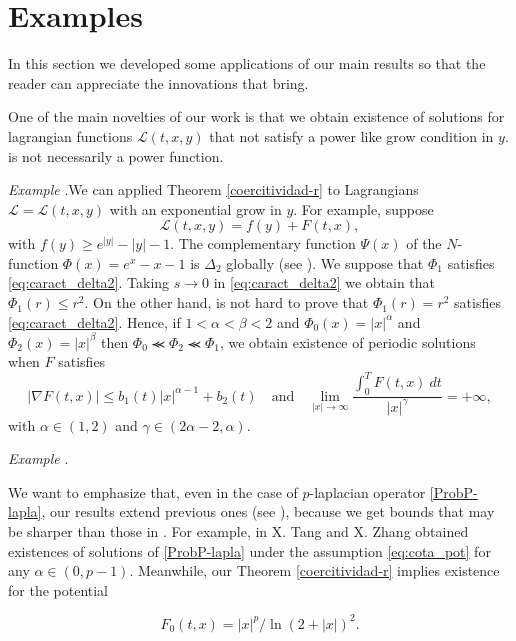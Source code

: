 \documentclass[twoside]{article}
\theoremstyle{remark}
\renewcommand{\leq}{\leqslant}
\renewcommand{\geq}{\geqslant}
\newcounter{example}
\newenvironment{example}{\noindent\textit{Example} \arabic{example}.}{\addtocounter{example}{1}}
\begin{document}
 \section{Examples}

 In this section we developed some applications of our main results
so that the reader can appreciate the innovations that bring.


One of the main novelties of our work is that we obtain existence of solutions for lagrangian functions $\mathcal{L}(t,x,y)$ that not satisfy a power like grow condition in $y$.   is not necessarily  a power function.

\begin{example}We can applied Theorem \ref{coercitividad-r} to Lagrangians $\mathcal{L}=\mathcal{L}(t,x,y)$ with an exponential grow in $y$. For example, suppose
  \[\mathcal{L}(t,x,y)=f(y)+F(t,x),\]
with $f(y)\geq e^{|y|}-|y|-1$. The complementary
function  $\Psi(x)$ of the $N$-function $\Phi(x)=e^{x}-x-1$ is $\Delta_2$ globally (see \cite[p. 28]{KR}).  We suppose that $\Phi_1$ satisfies \eqref{eq:caract_delta2}. Taking $s\to 0$ in \eqref{eq:caract_delta2} we obtain that $\Phi_1(r)\leq r^2$. On the other hand,  is not hard to prove that $\Phi_1(r)= r^2$ satisfies  \eqref{eq:caract_delta2}. Hence, if $1<\alpha<\beta<2$ and $\Phi_0(x)=|x|^{\alpha}$ and $\Phi_2(x)=|x|^{\beta}$ then $\Phi_0 \llcurly\Phi_2\llcurly\Phi_1$,  we obtain existence of periodic solutions when $F$
satisfies
\[\left| \nabla F(t,x) \right|\leq b_1(t)|x|^{\alpha-1}+b_2(t)\quad\text{and}\quad \lim_{|x|\to\infty}\frac{\int_{0}^{T}F(t,x)\ dt}{|x|^{\gamma}}=+\infty,\]
with $\alpha\in (1,2)$ and $\gamma\in (2\alpha-2,\alpha)$.
\end{example}






\begin{example}\end{example}
We want to emphasize that, even in the case of $p$-laplacian operator \eqref{ProbP-lapla}, our results  extend  previous ones (see \cite{tang1998periodic, tang2010periodic}), because
 we get bounds that may be  sharper than those in \cite{tang1998periodic,tang2010periodic}. 
For example, in  \cite[Th. 2.1]{tang2010periodic} X. Tang and X. Zhang obtained existences of solutions of \eqref{ProbP-lapla}
under the assumption \eqref{eq:cota_pot}
 for any $\alpha\in (0,p-1)$. Meanwhile, our Theorem \ref{coercitividad-r} implies existence for the potential

 \[F_0(t,x)=|x|^p/\ln(2+|x|)^2.\]
\end{document}
